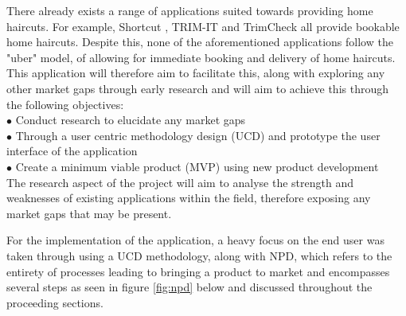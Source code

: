 \documentclass[12pt]{article}
\begin{document}
	There already exists a range of applications suited towards providing home haircuts. For example, Shortcut \cite{shortcut}, TRIM-IT\cite{trim-it} and TrimCheck\cite{trimcheck} all provide bookable home haircuts. Despite this, none of the aforementioned applications follow the "uber" model, of allowing for immediate booking and delivery of home haircuts. 
	\\
	
	This application will therefore aim to facilitate this, along with exploring any other market gaps through early research and will aim to achieve this through the following objectives:
	\\
	
	\noindent
	$\bullet$ Conduct research to elucidate any market gaps
	\\
	$\bullet$ Through a user centric methodology design (UCD) and prototype the user interface of the application
	\\
	$\bullet$ Create a minimum viable product (MVP) using new product development
	\\
	
	The research aspect of the project will aim to analyse the strength and weaknesses of existing applications within the field, therefore exposing any market gaps that may be present. 
	
	For the implementation of the application, a heavy focus on the end user was taken through using a UCD methodology, along with NPD, which refers to the  entirety of processes leading to bringing a product to market and encompasses several steps as seen in figure \ref{fig:npd} below and discussed throughout the proceeding sections.
	\newline
	
\end{document}
